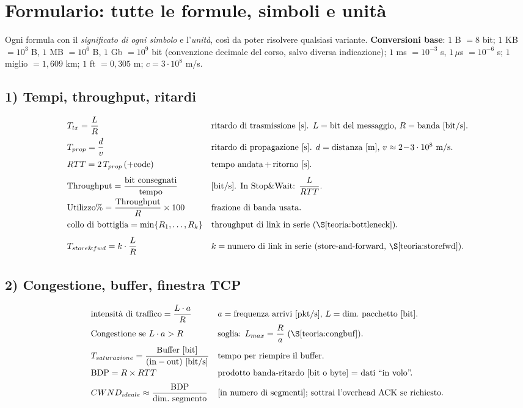 \documentclass[11pt,a4paper]{report}
\begin{document}
\section{Formulario: tutte le formule, simboli e unità}
\label{teoria:formulario}
Ogni formula con il \emph{significato di ogni simbolo} e l'\emph{unità}, così da
poter risolvere qualsiasi variante. \textbf{Conversioni base}: $1$ B $=8$ bit;
$1$ KB $=10^3$ B, $1$ MB $=10^6$ B, $1$ Gb $=10^9$ bit (convenzione decimale del
corso, salvo diversa indicazione); $1$ ms $=10^{-3}$ s, $1\,\mu$s $=10^{-6}$ s;
$1$ miglio $=1{,}609$ km; $1$ ft $=0{,}305$ m; $c=3\cdot10^8$ m/s.

\subsection*{1) Tempi, throughput, ritardi}
\[
\begin{array}{ll}
T_{tx}=\dfrac{L}{R} & \text{ritardo di trasmissione [s]. } L=\text{bit del messaggio, } R=\text{banda [bit/s].}\\[8pt]
T_{prop}=\dfrac{d}{v} & \text{ritardo di propagazione [s]. } d=\text{distanza [m], } v\approx 2\!-\!3\cdot10^8 \text{ m/s.}\\[8pt]
RTT = 2\,T_{prop}\,(+\text{code}) & \text{tempo andata\,+\,ritorno [s].}\\[8pt]
\text{Throughput}=\dfrac{\text{bit consegnati}}{\text{tempo}} & \text{[bit/s]. In Stop\&Wait: } \dfrac{L}{RTT}.\\[8pt]
\text{Utilizzo}\%=\dfrac{\text{Throughput}}{R}\times100 & \text{frazione di banda usata.}\\[8pt]
\text{collo di bottiglia}=\min\{R_1,\dots,R_k\} & \text{throughput di link in serie (}\S\ref{teoria:bottleneck}\text{).}\\[8pt]
T_{store\&fwd}=k\cdot\dfrac{L}{R} & k=\text{numero di link in serie (store-and-forward, }\S\ref{teoria:storefwd}\text{).}\\[6pt]
\end{array}
\]

\subsection*{2) Congestione, buffer, finestra TCP}
\[
\begin{array}{ll}
\text{intensità di traffico}=\dfrac{L\cdot a}{R} & a=\text{frequenza arrivi [pkt/s], } L=\text{dim.\ pacchetto [bit].}\\[6pt]
\text{Congestione se } L\cdot a > R & \text{soglia: } L_{max}=\dfrac{R}{a} \text{ (}\S\ref{teoria:congbuf}\text{).}\\[8pt]
T_{saturazione}=\dfrac{\text{Buffer [bit]}}{(\text{in}-\text{out}) \text{ [bit/s]}} & \text{tempo per riempire il buffer.}\\[8pt]
\text{BDP}=R\times RTT & \text{prodotto banda-ritardo [bit o byte] = dati ``in volo''.}\\[6pt]
CWND_{ideale}\approx \dfrac{\text{BDP}}{\text{dim.\ segmento}} & \text{[in numero di segmenti]; sottrai l'overhead ACK se richiesto.}\\[6pt]
\end{array}
\]
\end{document}
